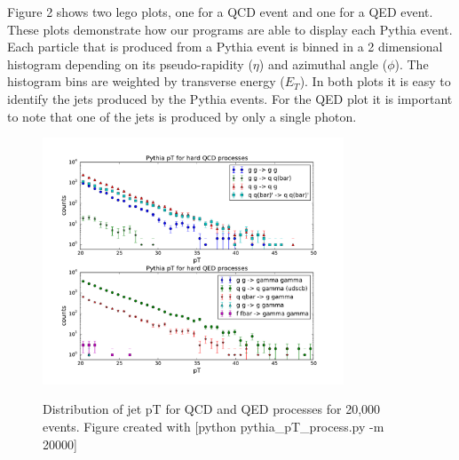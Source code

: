 \documentclass[11pt]{article}
\begin{document}
Figure 2 shows two lego plots, one for a QCD event and one for a QED event. These plots demonstrate how our programs are able to display each Pythia event. Each particle that is produced from a Pythia event is binned in a 2 dimensional histogram depending on its pseudo-rapidity ($\eta$) and azimuthal angle ($\phi$). The histogram bins are weighted by transverse energy ($E_T$). In both plots it is easy to identify the jets produced by the Pythia events. For the QED plot it is important to note that one of the jets is produced by only a single photon. 

\begin{figure}[h]
\begin{center}
\includegraphics[width=0.8\textwidth]{pythia_pT_process.pdf}
\label{fig_label}
\caption{Distribution of jet pT for QCD and QED processes for 20,000 events.  Figure created with [python pythia\_pT\_process.py -m 20000]}
\end{center}
\end{figure}
\end{document}
